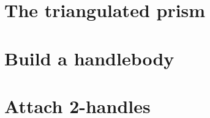 \label{cha:alg3}


\section{The triangulated prism}


\section{Build a handlebody}


\section{Attach 2-handles}


